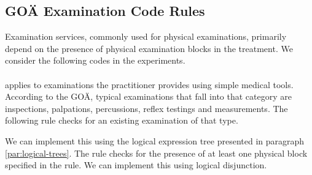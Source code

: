 \subsection{GOÄ Examination Code Rules}\label{subsec:examination-code-rules}
Examination services, commonly used for physical examinations, primarily depend on the presence of physical examination blocks in the treatment.
We consider the following codes in the experiments.

\paragraph{}
 applies to examinations the practitioner provides using simple medical tools.
According to the GOÄ, typical examinations that fall into that category are inspections, palpations, percussions, reflex testings and measurements.
The following rule checks for an existing examination of that type.


We can implement this using the logical expression tree presented in paragraph \ref{par:logical-trees}.
The rule checks for the presence of at least one physical block specified in the rule.
We can implement this using logical disjunction.

